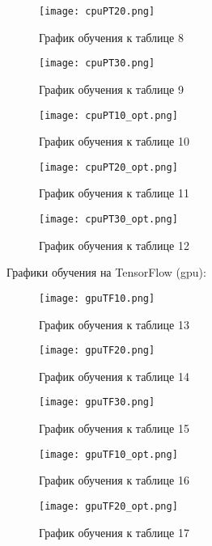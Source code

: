 \documentclass[a4paper,12pt,titlepage,final]{article}
\begin{document}
\begin{figure}[H]
\centering
\texttt{[image: cpuPT20.png]}
\caption{График обучения к таблице 8}
\label{cpupt20}
\end{figure}

\begin{figure}[H]
\centering
\texttt{[image: cpuPT30.png]}
\caption{График обучения к таблице 9}
\label{cpupt30}
\end{figure}

\begin{figure}[H]
\centering
\texttt{[image: cpuPT10\_opt.png]}
\caption{График обучения к таблице 10}
\label{cpupt10_opt}
\end{figure}

\begin{figure}[H]
\centering
\texttt{[image: cpuPT20\_opt.png]}
\caption{График обучения к таблице 11}
\label{cpupt20_opt}
\end{figure}

\begin{figure}[H]
\centering
\texttt{[image: cpuPT30\_opt.png]}
\caption{График обучения к таблице 12}
\label{cpupt30_opt}
\end{figure}

\newpage
Графики обучения на TensorFlow (gpu):

\begin{figure}[H]
\centering
\texttt{[image: gpuTF10.png]}
\caption{График обучения к таблице 13}
\label{gputf10}
\end{figure}

\begin{figure}[H]
\centering
\texttt{[image: gpuTF20.png]}
\caption{График обучения к таблице 14}
\label{gputf20}
\end{figure}

\begin{figure}[H]
\centering
\texttt{[image: gpuTF30.png]}
\caption{График обучения к таблице 15}
\label{gputf30}
\end{figure}

\begin{figure}[H]
\centering
\texttt{[image: gpuTF10\_opt.png]}
\caption{График обучения к таблице 16}
\label{gputf10_opt}
\end{figure}

\begin{figure}[H]
\centering
\texttt{[image: gpuTF20\_opt.png]}
\caption{График обучения к таблице 17}
\label{gputf20_opt}
\end{figure}
\end{document}
